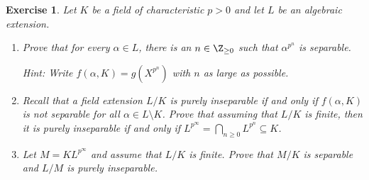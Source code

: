 \documentclass[a4paper,10pt,reqno]{amsart}
\newtheorem{ex}{Exercise}[section]
\begin{document}
\begin{ex}
\label{7.3}
Let $K$ be a field of characteristic $p > 0$ and let $L$ be an algebraic extension.
\begin{enumerate}[label=(\roman*)]
        \item Prove that for every $\alpha \in L$, there is an $n \in \Z_{\geq 0}$ such that $\alpha^{p^n}$ is separable.

        \noindent \textit{Hint}: Write $f(\alpha,K) = g(X^{p^n})$ with $n$ as large as possible.
        \item Recall that a field extension $L/K$ is \emph{purely inseparable} if and only if 
        $f(\alpha,K)$ is not separable for all $\alpha \in L\setminus K$.
        Prove that assuming that $L/K$ is finite, then it is purely inseparable if and only if $L^{p^{\infty}} = \bigcap_{n \geq 0} L^{p^n} \subseteq K$.
        \item Let $M = K L^{p^{\infty}}$ and assume that $L/K$ is finite. Prove that $M/K$ is separable and $L/M$ is purely inseparable.
    \end{enumerate}
\end{ex}
\end{document}
